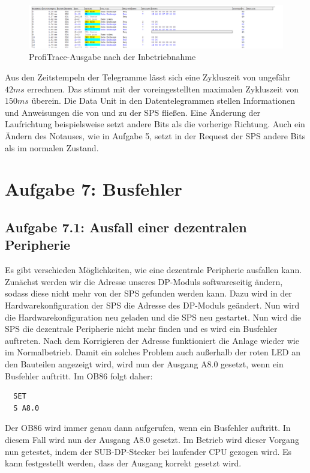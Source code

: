 \documentclass{report}
\begin{document}
\begin{figure}[H]
  \centering
  \label{fig:profitrace}
  \includegraphics[width=\textwidth]{assets/img/profitrace.png}
  \caption{ProfiTrace-Ausgabe nach der Inbetriebnahme}
\end{figure}

Aus den Zeitstempeln der Telegramme lässt sich eine Zykluszeit von ungefähr $42ms$ errechnen. Das stimmt mit der voreingestellten maximalen Zykluszeit von $150ms$ überein.
Die Data Unit in den Datentelegrammen stellen Informationen und Anweisungen die von und zu der SPS fließen. Eine Änderung der Laufrichtung beispielsweise setzt andere Bits als die vorherige Richtung. Auch ein Ändern des Notauses, wie in Aufgabe 5, setzt in der Request der SPS andere Bits als im normalen Zustand. 

\section{Aufgabe 7: Busfehler}

\subsection{Aufgabe 7.1: Ausfall einer dezentralen Peripherie}

Es gibt verschieden Möglichkeiten, wie eine dezentrale Peripherie ausfallen kann. Zunächst werden wir die Adresse unseres DP-Moduls softwareseitig ändern, sodass diese nicht mehr von der SPS gefunden werden kann. Dazu wird in der Hardwarekonfiguration der SPS die Adresse des DP-Moduls geändert. Nun wird die Hardwarekonfiguration neu geladen und die SPS neu gestartet. Nun wird die SPS die dezentrale Peripherie nicht mehr finden und es wird ein Busfehler auftreten. Nach dem Korrigieren der Adresse funktioniert die Anlage wieder wie im Normalbetrieb.
Damit ein solches Problem auch außerhalb der roten LED an den Bauteilen angezeigt wird, wird nun der Ausgang A8.0 gesetzt, wenn ein Busfehler auftritt. Im OB86 folgt daher:

\begin{lstlisting}
  SET
  S A8.0
\end{lstlisting}
Der OB86 wird immer genau dann aufgerufen, wenn ein Busfehler auftritt. In diesem Fall wird nun der Ausgang A8.0 gesetzt. Im Betrieb wird dieser Vorgang nun getestet, indem der SUB-DP-Stecker bei laufender CPU gezogen wird. Es kann festgestellt werden, dass der Ausgang korrekt gesetzt wird.
\end{document}
